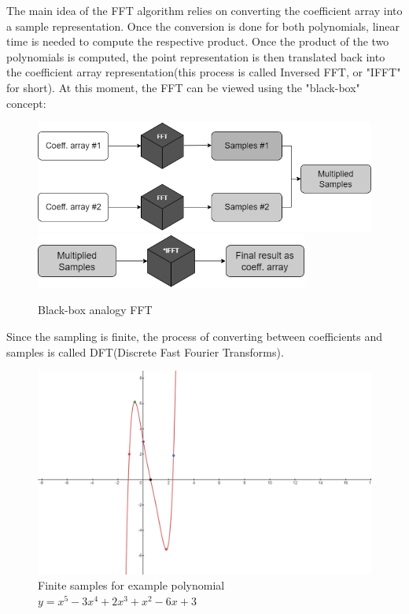 \documentclass[letterpaper]{article}
\begin{document}
The main idea of the FFT algorithm relies on converting the coefficient array into a sample representation. Once the conversion is done for both polynomials, linear time is needed to compute the respective product. Once the product of the two polynomials is computed, the point representation is then translated back into the coefficient array representation(this process is called Inversed FFT, or "IFFT" for short). At this moment, the FFT can be viewed using the "black-box" concept:

\newpage


\begin{figure} [h!]
\centering
\includegraphics[width=1\textwidth]{pngOfDiagrams/FFT3.png}
\includegraphics[width=0.8\textwidth]{pngOfDiagrams/FFT4.png}
\caption{Black-box analogy FFT}
\end{figure}

Since the sampling is finite, the process of converting between coefficients and samples is called DFT(Discrete Fast Fourier Transforms).

\begin{figure} [h!]
\centering
\includegraphics[width=0.9
\textwidth]{pngOfDiagrams/FFT2-DFT.png}
\caption{Finite samples for example polynomial $y = x^{5} -3x^4 + 2x^3 + x^2 -6x + 3$}
\end{figure}
\end{document}

